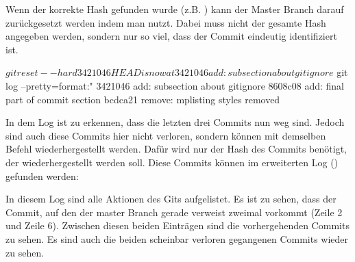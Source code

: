 Wenn der korrekte Hash gefunden wurde (z.B. )  kann der Master Branch darauf zurückgesetzt werden indem man  nutzt. Dabei muss nicht der gesamte Hash angegeben werden, sondern nur so viel, dass der Commit eindeutig identifiziert ist.
\begin{mplisting}
$ git reset --hard 3421046
HEAD is now at 3421046 add: subsection about gitignore
$ git log --pretty=format:"%
3421046 add: subsection about gitignore
8608c08 add: final part of commit section
bcdca21 remove: mplisting styles removed
\end{mplisting}
In dem Log ist zu erkennen, dass die letzten drei Commits nun weg sind. Jedoch sind auch diese Commits hier nicht verloren, sondern können mit demselben Befehl wiederhergestellt werden. Dafür wird nur der Hash des Commits benötigt, der wiederhergestellt werden soll. Diese Commits können im erweiterten Log () gefunden werden:
In diesem Log sind alle Aktionen des Gits aufgelistet. Es ist zu sehen, dass der Commit, auf den der master Branch gerade verweist zweimal vorkommt (Zeile 2 und Zeile 6). Zwischen diesen beiden Einträgen sind die vorhergehenden Commits zu sehen. Es sind auch die beiden scheinbar verloren gegangenen Commits wieder zu sehen.






